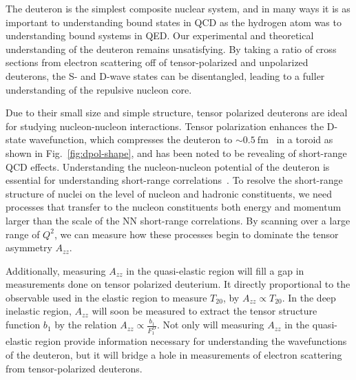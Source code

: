 
The deuteron is the simplest composite nuclear system, and in many ways it is as important to understanding bound states in QCD as the hydrogen atom was to understanding bound systems in QED.  Our experimental and theoretical understanding of the deuteron remains unsatisfying. By taking a ratio of cross sections from electron scattering off of tensor-polarized and unpolarized deuterons, the S- and D-wave states can be disentangled, leading to a fuller understanding of the repulsive nucleon core. 

Due to their small size and simple structure, tensor polarized deuterons are ideal for studying nucleon-nucleon interactions. Tensor polarization enhances the D-state wavefunction, which compresses the deuteron to $\sim0.5\mathrm{~fm}$~\cite{Forest:1996kp} in a toroid as shown in Fig.~\ref{fig:dpol-shape}, and has been noted to be revealing of short-range QCD effects. Understanding the nucleon-nucleon potential of the deuteron is essential for understanding short-range correlations~\cite{Arrington:2011xs}. To resolve the short-range structure of nuclei on the level of nucleon and hadronic constituents, we need processes that transfer to the nucleon constituents both energy and momentum larger than the scale of the NN short-range correlations. By scanning over a large range of $Q^2$, we can measure how these processes begin to dominate the tensor asymmetry $A_{zz}$.

Additionally, measuring $A_{zz}$ in the quasi-elastic region will fill a gap in measurements done on tensor polarized deuterium. It directly proportional to the observable used in the elastic region to measure $T_{20}$, by $A_{zz} \propto T_{20}$. In the deep inelastic region, $A_{zz}$ will soon be measured to extract the tensor structure function $b_1$ by the relation $A_{zz} \propto \frac{b_1}{F_1^D}$. Not only will measuring $A_{zz}$ in the quasi-elastic region provide information necessary for understanding the wavefunctions of the deuteron, but it will bridge a hole in measurements of electron scattering from tensor-polarized deuterons.



